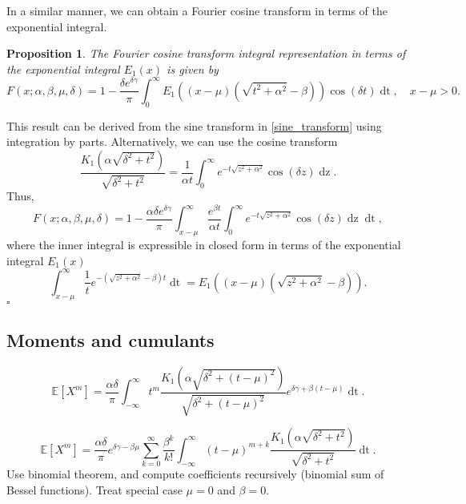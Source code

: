\documentclass[10pt,a4paper,oneside]{article}
\newtheorem{proposition}[theorem]{Proposition}
\newenvironment{proof}{\noindent{\bf Proof:}}{\hfill$\square$}
\numberwithin{equation}{section}
\begin{document}
In a similar manner, we can obtain a Fourier cosine transform in terms of the exponential integral.
\begin{proposition}
The Fourier cosine transform integral representation in terms of the exponential integral $E_1(x)$ is given by
\begin{equation}
F(x; \alpha, \beta, \mu, \delta) = 1 - \frac{\delta e^{\delta \gamma}}{\pi}\int_0^{\infty} E_1\left((x-\mu)(\sqrt{t^2 + \alpha^2} - \beta)\right) \cos(\delta t) \mathop{dt}, \quad x-\mu > 0.
\end{equation}
\end{proposition}
\begin{proof}
This result can be derived from the sine transform in \eqref{sine_transform} using integration by parts. Alternatively, we can use the cosine transform \cite[\S 1.4]{Bateman1954}
\begin{equation*}
\frac{K_1\left(\alpha\sqrt{\delta^2 + t^2}\right)}{\sqrt{\delta^2 + t^2}} = \frac{1}{\alpha t}\int_0^{\infty} e^{-t\sqrt{z^2 + \alpha^2}} \cos(\delta z) \mathop{dz}.
\end{equation*}
Thus,
\begin{equation*}
F(x; \alpha, \beta, \mu, \delta) = 1 - \frac{\alpha \delta e^{\delta \gamma}}{\pi}\int_{x-\mu}^{\infty} \frac{e^{\beta t}}{\alpha t}\int_0^{\infty} e^{-t\sqrt{z^2 + \alpha^2}} \cos(\delta z) \mathop{dz} \mathop{dt},
\end{equation*}
where the inner integral is expressible in closed form in terms of the exponential integral $E_1(x)$
\begin{equation*}
\int_{x-\mu}^{\infty}\frac{1}{t}e^{-(\sqrt{z^2 + \alpha^2} - \beta)t} \mathop{dt} = E_1\left((x-\mu)(\sqrt{z^2 + \alpha^2} - \beta)\right).
\end{equation*}
\end{proof}


\subsection{Moments and cumulants}

\begin{equation}
\mathbb{E}[X^m] = \frac{\alpha \delta}{\pi} \int_{-\infty}^{\infty} t^m\frac{K_1\left(\alpha\sqrt{\delta^2 + (t-\mu)^2}\right)}{\sqrt{\delta^2 + (t-\mu)^2}} e^{\delta \gamma + \beta(t-\mu)} \mathop{dt}.
\end{equation}

\begin{equation}
\mathbb{E}[X^m] = \frac{\alpha \delta}{\pi} e^{\delta \gamma - \beta \mu} \sum_{k=0}^{\infty} \frac{\beta^k}{k!}\int_{-\infty}^{\infty} (t-\mu)^{m+k}\frac{K_1\left(\alpha\sqrt{\delta^2 + t^2}\right)}{\sqrt{\delta^2 + t^2}} \mathop{dt}.
\end{equation}
Use binomial theorem, and compute coefficients recursively (binomial sum of Bessel functions). Treat special case $\mu = 0$ and $\beta=0$.
\end{document}

